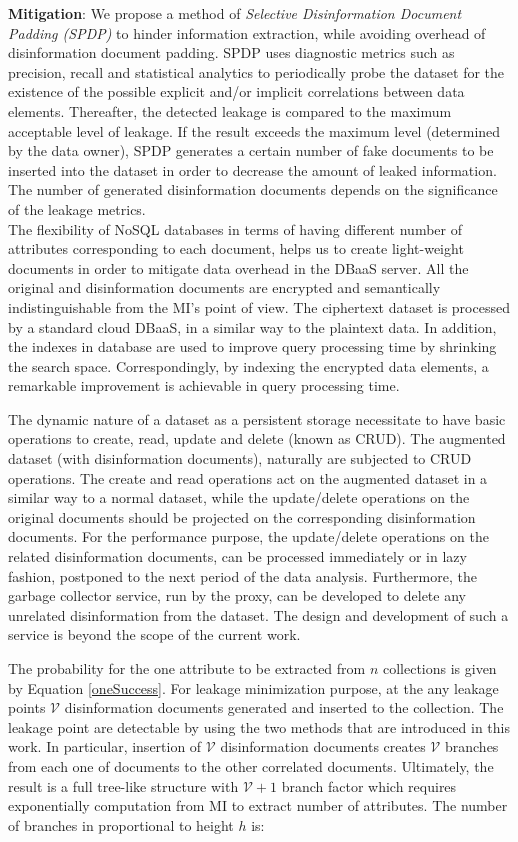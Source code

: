 \textbf{Mitigation}: We propose a method of \emph{Selective Disinformation Document Padding (SPDP)} to hinder information extraction, while avoiding overhead of disinformation document padding. SPDP uses diagnostic metrics such as precision, recall and statistical analytics to periodically probe the dataset for the existence of the possible explicit and/or implicit correlations between data elements. Thereafter, the detected leakage is compared to the maximum acceptable level of leakage. If the result exceeds the maximum level (determined by the data owner), SPDP generates a certain number of fake documents to be inserted into the dataset in order to decrease the amount of leaked information. The number of generated disinformation documents depends on the significance of the leakage metrics.\\

The flexibility of NoSQL databases in terms of having different number of attributes corresponding to each document, helps us to create light-weight documents in order to mitigate data overhead in the DBaaS server. All the original and disinformation documents are encrypted and semantically indistinguishable from the MI’s point of view. The ciphertext dataset is processed by a standard cloud DBaaS, in a similar way to the plaintext data. In addition, the indexes in database are used to improve query processing time by shrinking the search space. Correspondingly, by indexing the encrypted data elements, a remarkable improvement is achievable in query processing time.

The dynamic nature of a dataset as a persistent storage necessitate to have basic operations to create, read, update and delete (known as CRUD). The augmented dataset (with disinformation documents), naturally are subjected to CRUD operations.  The create and read operations act on the augmented dataset in a similar way to a normal dataset, while the update/delete operations on the original documents should be projected on the corresponding disinformation documents. For the performance purpose, the update/delete operations on the related disinformation documents, can be processed immediately or in lazy fashion, postponed to the next period of the data analysis.
Furthermore, the garbage collector service, run by the proxy, can be developed to delete any unrelated disinformation from the dataset. The design and development of such a service is beyond the scope of the current work. 

The probability for the one attribute to be extracted from $n$ collections is given by Equation \ref{oneSuccess}. For leakage minimization purpose, at the any leakage points $\mathcal{V}$ disinformation documents generated and inserted to the collection. The leakage point are detectable by using the two methods that are introduced in this work. In particular, insertion of $\mathcal{V}$ disinformation documents creates $\mathcal{V}$ branches from each one of documents to the other correlated documents. Ultimately, the result is a full tree-like structure with $\mathcal{V}+1$ branch factor which requires exponentially computation from MI to extract number of attributes. The number of branches in proportional to height $h$ is:    

